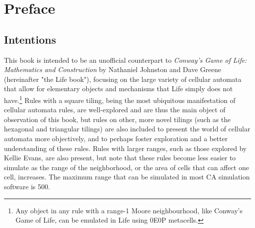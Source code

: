 \documentclass[
	11pt, %
	fleqn, %
	a4paper, %
]{LegrandOrangeBook}
\begin{document}

\pagestyle{fancy} %

\cleardoublepage %


\frontmatter


\section*{Preface}
\subsection*{Intentions}
This book is intended to be an unofficial counterpart to \textit{Conway's Game of Life: Mathematics and Construction} by Nathaniel Johnston and Dave Greene (hereinafter "the Life book"), focusing on the large variety of cellular automata that allow for elementary objects and mechanisms that Life simply does not have.\footnote{Any object in any rule with a range-1 Moore neighbourhood, like Conway's Game of Life, can be emulated in Life using 0E0P metacells.}  Rules with a square tiling, being the most ubiquitous manifestation of cellular automata rules, are well-explored and are thus the main object of observation of this book, but rules on other, more novel tilings (such as the hexagonal and triangular tilings) are also included to present the world of cellular automata more objectively, and to perhaps foster exploration and a better understanding of these rules. Rules with larger ranges, such as those explored by Kellie Evans, are also present, but note that these rules become less easier to simulate as the range of the neighborhood, or the area of cells that can affect one cell, increases. The maximum range that can be simulated in most CA simulation software is 500.
\end{document}
